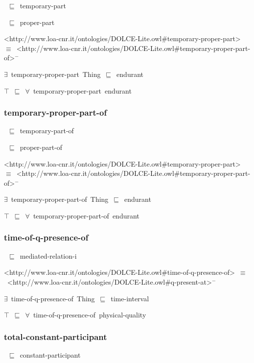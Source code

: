 \documentclass{article}
\begin{document}
~\ensuremath{\sqsubseteq}~temporary-part

~\ensuremath{\sqsubseteq}~proper-part

<http://www.loa-cnr.it/ontologies/DOLCE-Lite.owl#temporary-proper-part>~\ensuremath{\equiv}~<http://www.loa-cnr.it/ontologies/DOLCE-Lite.owl#temporary-proper-part-of>\ensuremath{^-}

\ensuremath{\exists}~temporary-proper-part~Thing~\ensuremath{\sqsubseteq}~endurant

\ensuremath{\top}~\ensuremath{\sqsubseteq}~\ensuremath{\forall}~temporary-proper-part~endurant

\subsubsection*{temporary-proper-part-of}

~\ensuremath{\sqsubseteq}~temporary-part-of

~\ensuremath{\sqsubseteq}~proper-part-of

<http://www.loa-cnr.it/ontologies/DOLCE-Lite.owl#temporary-proper-part>~\ensuremath{\equiv}~<http://www.loa-cnr.it/ontologies/DOLCE-Lite.owl#temporary-proper-part-of>\ensuremath{^-}

\ensuremath{\exists}~temporary-proper-part-of~Thing~\ensuremath{\sqsubseteq}~endurant

\ensuremath{\top}~\ensuremath{\sqsubseteq}~\ensuremath{\forall}~temporary-proper-part-of~endurant

\subsubsection*{time-of-q-presence-of}

~\ensuremath{\sqsubseteq}~mediated-relation-i

<http://www.loa-cnr.it/ontologies/DOLCE-Lite.owl#time-of-q-presence-of>~\ensuremath{\equiv}~<http://www.loa-cnr.it/ontologies/DOLCE-Lite.owl#q-present-at>\ensuremath{^-}

\ensuremath{\exists}~time-of-q-presence-of~Thing~\ensuremath{\sqsubseteq}~time-interval

\ensuremath{\top}~\ensuremath{\sqsubseteq}~\ensuremath{\forall}~time-of-q-presence-of~physical-quality

\subsubsection*{total-constant-participant}

~\ensuremath{\sqsubseteq}~constant-participant
\end{document}
